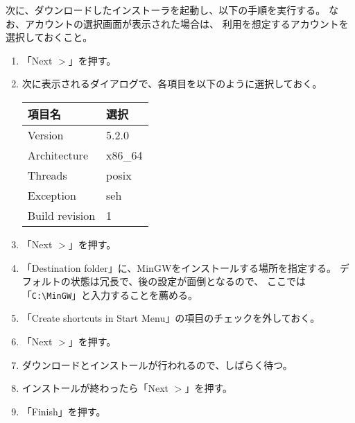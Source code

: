 \documentclass[a4paper]{jsarticle}
\begin{document}
次に、ダウンロードしたインストーラを起動し、以下の手順を実行する。
なお、アカウントの選択画面が表示された場合は、
利用を想定するアカウントを選択しておくこと。
\begin{enumerate}
 \item 「Next \(>\)」を押す。
 \item 次に表示されるダイアログで、各項目を以下のように選択しておく。	
	\begin{center}
	\begin{tabular}{|l|l|}
		\hline
		項目名 & 選択 \\ \hline
		Version &  5.2.0 \\ \hline
		Architecture & x86\_64 \\ \hline
		Threads & posix \\ \hline
		Exception & seh \\ \hline
		Build revision & 1 \\ \hline
	\end{tabular}
	\end{center}
 \item 「Next \(>\)」を押す。
 \item 「Destination folder」に、MinGWをインストールする場所を指定する。
	デフォルトの状態は冗長で、後の設定が面倒となるので、
	ここでは「\verb+C:\MinGW+」と入力することを薦める。
 \item 「Create shortcuts in Start Menu」の項目のチェックを外しておく。
 \item 「Next \(>\)」を押す。
 \item ダウンロードとインストールが行われるので、しばらく待つ。
 \item インストールが終わったら「Next \(>\)」を押す。
 \item 「Finish」を押す。
\end{enumerate}
\end{document}
